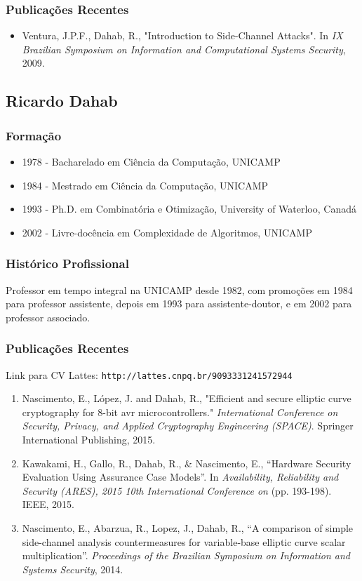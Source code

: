 \documentclass[12pt]{article}
\begin{document}
\subsubsection{Publicações Recentes}
\begin{itemize}\setlength\itemsep{1pt}
\item Ventura, J.P.F., Dahab, R., "Introduction to Side-Channel Attacks". In \textit{IX Brazilian Symposium on Information and Computational Systems Security}, 2009.
\end{itemize}

\subsection{Ricardo Dahab}
\subsubsection{Formação}
\begin{itemize}
\item 1978 - Bacharelado em Ciência da Computação, UNICAMP
\item 1984 - Mestrado em Ciência da Computação, UNICAMP
\item 1993 - Ph.D. em Combinatória e Otimização, University of Waterloo, Canadá
\item 2002 - Livre-docência em Complexidade de Algoritmos, UNICAMP
\end{itemize}
\subsubsection{Histórico Profissional}
Professor em tempo integral na UNICAMP desde 1982, com promoções em 1984 para professor assistente, depois em 1993 para assistente-doutor, e em 2002 para professor associado. 

\subsubsection{Publicações Recentes}
Link para CV Lattes: \texttt{http://lattes.cnpq.br/9093331241572944}
\begin{enumerate}\setlength\itemsep{1pt}
    \item Nascimento, E., López, J. and Dahab, R., "Efficient and secure elliptic curve cryptography for 8-bit avr microcontrollers." \textsl{International Conference on Security, Privacy, and Applied Cryptography Engineering (SPACE)}. Springer International Publishing, 2015. 
    \item Kawakami, H., Gallo, R., Dahab, R., \& Nascimento, E., “Hardware Security Evaluation Using Assurance Case Models”. In \textsl{Availability, Reliability and Security (ARES), 2015 10th International Conference on} (pp. 193-198). IEEE, 2015.
    \item Nascimento, E., Abarzua, R., Lopez, J., Dahab, R., “A comparison of simple side-channel analysis countermeasures for variable-base elliptic curve scalar multiplication”. \textsl{Proceedings of the Brazilian Symposium on Information and Systems Security}, 2014.
\end{enumerate}
\end{document}
